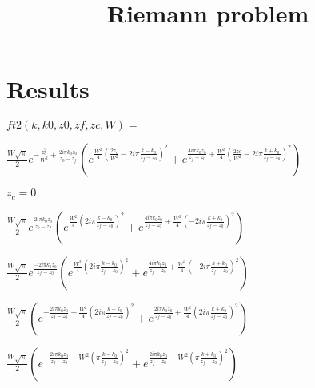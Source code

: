 \documentclass[12pt]{book}
\title{Riemann problem}
\date{}
\begin{document}
\section*{Results}


$ft2(k, k0, z0, zf, zc, W)= $


$ \frac{W \sqrt{\pi}}{2} e^{-\frac{z_c^2}{W^2} + \frac{ 2 i \pi k_0  z_0}{z_0 - z_f}} (e^{ \frac {W^2 }{4} ( \frac{2 z_c}{W^2} - 2 i \pi  \frac{k - k_0}{z_f - z_0})^2} + e^{ \frac{ 4i \pi k_0 z_0}{z_f-z_0} + \frac{W^2 }{4} ( \frac{2 zc}{W^2} - 2i \pi \frac{k + k_0}{z_f - z_0})^2}) $

$z_c = 0$

$ \frac{W \sqrt{\pi}}{2} e^{ \frac{ 2 i \pi k_0  z_0}{z_0 - z_f}} (e^{ \frac {W^2 }{4} ( 2 i \pi  \frac{k - k_0}{z_f - z_0})^2} + e^{ \frac{ 4i \pi k_0 z_0}{z_f-z_0} + \frac{W^2 }{4} ( - 2i \pi \frac{k + k_0}{z_f - z_0})^2}) $

$ \frac{W \sqrt{\pi}}{2} e^{ \frac{ - 2 i \pi k_0  z_0}{z_f - z_0}} (e^{ \frac {W^2 }{4} ( 2 i \pi  \frac{k - k_0}{z_f - z_0})^2} + e^{ \frac{ 4i \pi k_0 z_0}{z_f-z_0} + \frac{W^2 }{4} ( - 2i \pi \frac{k + k_0}{z_f - z_0})^2}) $

$ \frac{W \sqrt{\pi}}{2}  (e^{ - \frac{ 2 i \pi k_0  z_0}{z_f - z_0} + \frac {W^2 }{4} ( 2 i \pi  \frac{k - k_0}{z_f - z_0})^2} + e^{ \frac{ 2i \pi k_0 z_0}{z_f-z_0} + \frac{W^2 }{4} ( 2i \pi \frac{k + k_0}{z_f - z_0})^2}) $

$ \frac{W \sqrt{\pi}}{2}  (e^{ - \frac{ 2 i \pi k_0  z_0}{z_f - z_0} - W^2  (  \pi  \frac{k - k_0}{z_f - z_0})^2} + e^{ \frac{ 2i \pi k_0 z_0}{z_f-z_0} - W^2 (\pi \frac{k + k_0}{z_f - z_0})^2}) $
\end{document}
